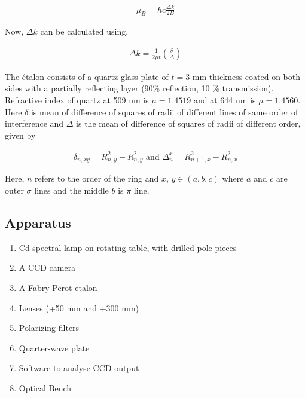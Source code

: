 \begin{align} \label{straight}
    \mu_B = hc\frac{\Delta k}{2B}
\end{align}

Now, $\Delta k$ can be calculated using,

\begin{align} \label{delk}
    \Delta k = \frac{1}{2\mu t}\left(\frac{\delta}{\Delta}\right)
\end{align}

The étalon consists of a quartz glass plate of $t=3$ mm thickness coated on both sides with a partially reflecting layer (90\% reflection, 10 \% transmission). Refractive index of quartz at 509 nm is $\mu=1.4519$ and
at 644 nm is $\mu=1.4560$. Here $\delta$ is mean of difference of squares of radii of different lines of same order of
interference and $\Delta$ is the mean of difference of squares of radii of different order, given by

\begin{align} \label{deltas}
    \delta_{n,xy} = R^2_{n,y}-R^2_{n,y}\text{ and }\Delta^x_n=R^2_{n+1,x}-R^2_{n,x}
\end{align}

Here, $n$ refers to the order of the ring and $x,\,y \in (a,b,c)$ where $a$ and $c$ are outer $\sigma$ lines and the middle $b$ is $\pi$ line. 

\subsection*{Apparatus}

\begin{enumerate}
    \item Cd-spectral lamp on rotating table, with drilled pole pieces
    \item A CCD camera
    \item A Fabry-Perot etalon
    \item Lenses (+50 mm and +300 mm)
    \item Polarizing filters
    \item Quarter-wave plate
    \item Software to analyse CCD output
    \item Optical Bench
\end{enumerate}